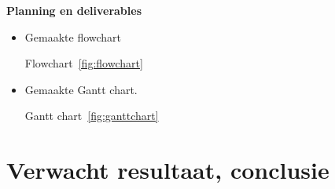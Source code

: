 \vspace{1em}
\textbf{Planning en deliverables}

\begin{itemize}
 \item Gemaakte flowchart

Flowchart~\ref{fig:flowchart}

 \item Gemaakte Gantt chart.

Gantt chart~\ref{fig:ganttchart}
\end{itemize}








\section{Verwacht resultaat, conclusie}%
\label{sec:verwachte_resultaten}


